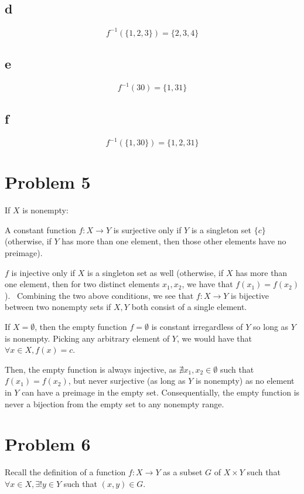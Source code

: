 \documentclass[12pt,letterpaper]{article}
\theoremstyle{definition}
\begin{document}
{\subsection*{d}

\[
  f^{-1}(\{1,2,3\}) = \{2,3,4\}
\]

\subsection*{e}

\[
  f^{-1}(30) = \{1,31\}
\]

\subsection*{f}

\[
  f^{-1}(\{1,30\}) = \{1,2,31\}
\]

\section*{Problem 5}

If $X$ is nonempty:

A constant function $f: X \rightarrow Y$ is surjective only if $Y$ is a
singleton set $\{c\}$ (otherwise, if $Y$ has more than one element, then those
other elements have no preimage).

$f$ is injective only if $X$ is a singleton set as well (otherwise, if $X$ has
more than one element, then for two distinct elements $x_1, x_2$, we have that
$f(x_1) = f(x_2)$).
\
Combining the two above conditions, we see that $f:X \rightarrow Y$ is bijective between two
nonempty sets if $X,Y$ both consist of a single element.

If $X = \emptyset$, then the empty function $f = \emptyset$ is constant
irregardless of $Y$ so long as $Y$ is nonempty. Picking any arbitrary element of
$Y$, we would have that $\forall x \in X, f(x) = c$.

Then, the empty function is always injective, as $\nexists x_1, x_2 \in
\emptyset$ such that $f(x_1) = f(x_2)$, but never surjective (as long as $Y$ is
nonempty) as no element in $Y$ can have a preimage in the empty set. Consequentially, the empty
function is never a bijection from the empty set to any nonempty range.

\section*{Problem 6}

Recall the definition of a function $f: X \rightarrow Y$ as a subset $G$ of $X \times Y$ such that
$\forall x \in X, \exists ! y \in Y$ such that $(x,y) \in G$.

}
\end{document}
